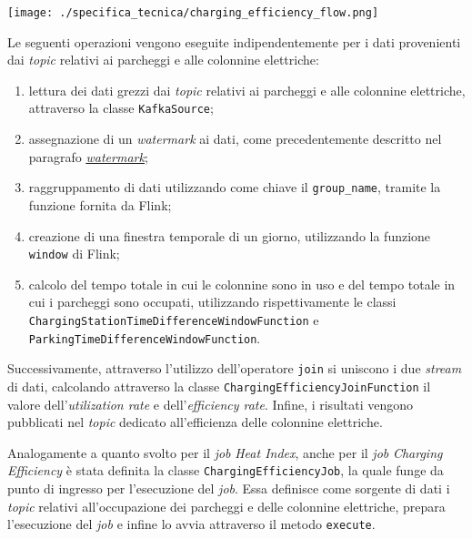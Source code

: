 \begin{center}
	\texttt{[image: ./specifica\_tecnica/charging\_efficiency\_flow.png]}
\end{center}
Le seguenti operazioni vengono eseguite indipendentemente per i dati provenienti dai \textit{topic} relativi ai parcheggi e alle colonnine elettriche:
\begin{enumerate}
	\item lettura dei dati grezzi dai \textit{topic} relativi ai parcheggi e alle colonnine elettriche, attraverso la classe \texttt{KafkaSource};
	\item assegnazione di un \textit{watermark} ai dati, come precedentemente descritto nel paragrafo \hyperref[watermark]{\underline{\textit{watermark}}};
	\item raggruppamento di dati utilizzando come chiave il \texttt{group\_name}, tramite la funzione \texttt{} fornita da Flink;
	\item creazione di una finestra temporale di un giorno, utilizzando la funzione \texttt{window} di Flink;
	\item calcolo del tempo totale in cui le colonnine sono in uso e del tempo totale in cui i parcheggi sono occupati, utilizzando rispettivamente le classi
	      \\\texttt{ChargingStationTimeDifferenceWindowFunction} e \texttt{ParkingTimeDifferenceWindowFunction}.
\end{enumerate}
Successivamente, attraverso l'utilizzo dell'operatore \texttt{join} si uniscono i due \textit{stream} di dati, calcolando
attraverso la classe \texttt{ChargingEfficiencyJoinFunction} il valore dell'\textit{utilization rate} e dell'\textit{efficiency rate}.
Infine, i risultati vengono pubblicati nel \textit{topic} dedicato all'efficienza delle colonnine elettriche.

Analogamente a quanto svolto per il \textit{job} \textit{Heat Index}, anche per il \textit{job} \textit{Charging Efficiency} è stata definita la
classe \texttt{ChargingEfficiencyJob}, la quale funge da punto di ingresso per l'esecuzione del \textit{job}. Essa definisce come sorgente di dati
i \textit{topic} relativi all'occupazione dei parcheggi e delle colonnine elettriche, prepara l'esecuzione del \textit{job} e infine lo avvia
attraverso il metodo \texttt{execute}.\\

